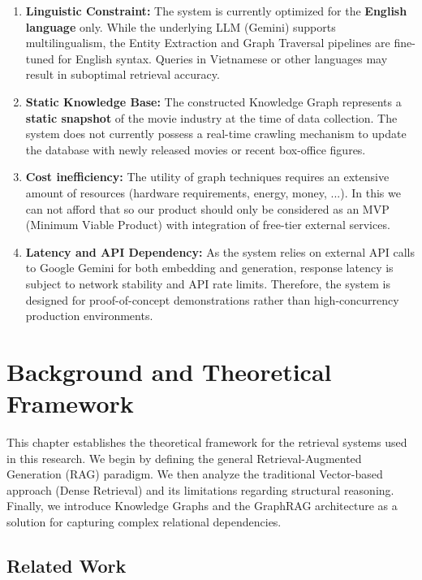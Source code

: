 \documentclass[a4paper, 12pt]{extreport}
\begin{document}
\begin{enumerate}
    \item \textbf{Linguistic Constraint:} The system is currently optimized for the \textbf{English language} only. While the underlying LLM (Gemini) supports multilingualism, the Entity Extraction and Graph Traversal pipelines are fine-tuned for English syntax. Queries in Vietnamese or other languages may result in suboptimal retrieval accuracy.
    
    \item \textbf{Static Knowledge Base:} The constructed Knowledge Graph represents a \textbf{static snapshot} of the movie industry at the time of data collection. The system does not currently possess a real-time crawling mechanism to update the database with newly released movies or recent box-office figures.

    \item \textbf{Cost inefficiency:} The utility of graph techniques requires an extensive amount of resources (hardware requirements, energy, money, ...). In this we can not afford that so our product should only be considered as an MVP (Minimum Viable Product) with integration of free-tier external services. 
    
    \item \textbf{Latency and API Dependency:} As the system relies on external API calls to Google Gemini for both embedding and generation, response latency is subject to network stability and API rate limits. Therefore, the system is designed for proof-of-concept demonstrations rather than high-concurrency production environments.

    
\end{enumerate}

\chapter{Background and Theoretical Framework}
This chapter establishes the theoretical framework for the retrieval systems used in this research. We begin by defining the general Retrieval-Augmented Generation (RAG) paradigm. We then analyze the traditional Vector-based approach (Dense Retrieval) and its limitations regarding structural reasoning. Finally, we introduce Knowledge Graphs and the GraphRAG architecture as a solution for capturing complex relational dependencies.
\section{Related Work}
\label{sec:related_work}
\end{document}
